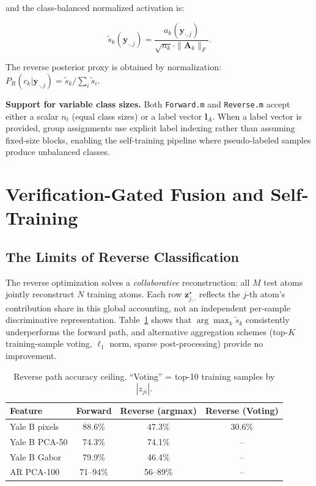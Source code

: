 \documentclass[10pt,comsoc]{IEEEtran}
\begin{document}
and the class-balanced normalized activation is:

\begin{equation}
\tilde{s}_k(\mathbf{y}_{\cdot,j}) = \frac{a_k(\mathbf{y}_{\cdot,j})}{\sqrt{n_k} \cdot \|\mathbf{A}_k\|_F}.
\end{equation}

The reverse posterior proxy is obtained by normalization: $P_R(c_k|\mathbf{y}_{\cdot,j}) = \tilde{s}_k / \sum_i \tilde{s}_i$.

\textbf{Support for variable class sizes.} Both \texttt{Forward.m} and \texttt{Reverse.m} accept either a scalar $n_t$ (equal class sizes) or a label vector $\mathbf{l}_A$. When a label vector is provided, group assignments use explicit label indexing rather than assuming fixed-size blocks, enabling the self-training pipeline where pseudo-labeled samples produce unbalanced classes.

\section{Verification-Gated Fusion and Self-Training}

\subsection{The Limits of Reverse Classification}

The reverse optimization solves a \emph{collaborative} reconstruction: all $M$ test atoms jointly reconstruct $N$ training atoms. Each row $\mathbf{z}_{j,\cdot}^\star$ reflects the $j$-th atom's contribution share in this global accounting, not an independent per-sample discriminative representation. Table~\ref{tab:rev_limits} shows that $\arg\max_k \tilde{s}_k$ consistently underperforms the forward path, and alternative aggregation schemes (top-$K$ training-sample voting, $\ell_1$ norm, sparse post-processing) provide no improvement.

\begin{table}[t]
\centering
\caption{Reverse path accuracy ceiling. ``Voting'' = top-10 training samples by $|z_{ji}|$.}
\label{tab:rev_limits}
\begin{tabular}{lccc}
\hline
\textbf{Feature} & \textbf{Forward} & \textbf{Reverse (argmax)} & \textbf{Reverse (Voting)} \\ \hline
Yale B pixels & 88.6\% & 47.3\% & 30.6\% \\
Yale B PCA-50 & 74.3\% & 74.1\% & -- \\
Yale B Gabor & 79.9\% & 46.4\% & -- \\
AR PCA-100 & 71--94\% & 56--89\% & -- \\ \hline
\end{tabular}
\end{table}
\end{document}
